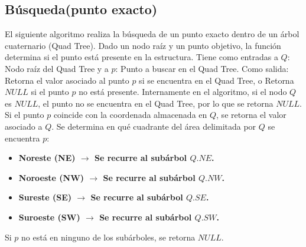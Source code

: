 \documentclass[9pt,a4paper,twoside]{rho-class/rho}
\begin{document}
            
        \subsection{Búsqueda(punto exacto)}
            El siguiente algoritmo realiza la búsqueda de un punto exacto dentro de un árbol cuaternario (Quad Tree). Dado un nodo raíz y un punto objetivo, la función determina si el punto está presente en la estructura. Tiene como entradas a $Q$: Nodo raíz del Quad Tree y a $p$: Punto a buscar en el Quad Tree. Como salida: Retorna el valor asociado al punto $p$ si se encuentra en el Quad Tree, o Retorna $NULL$ si el punto $p$ no está presente.
            Internamente en el algoritmo, si el nodo $Q$ es $NULL$, el punto no se encuentra en el Quad Tree, por lo que se retorna $NULL$. Si el punto $p$ coincide con la coordenada almacenada en $Q$, se retorna el valor asociado a $Q$. Se determina en qué cuadrante del área delimitada por $Q$ se encuentra $p$: \cite{samet_spatial_structures}
            \begin{itemize}
                \item \textbf{Noreste (NE) $\rightarrow$ Se recurre al subárbol $Q.NE$.}
                \item \textbf{Noroeste (NW) $\rightarrow$ Se recurre al subárbol $Q.NW$.}
                \item \textbf{Sureste (SE) $\rightarrow$ Se recurre al subárbol $Q.SE$.}
                \item \textbf{Suroeste (SW) $\rightarrow$ Se recurre al subárbol $Q.SW$.}
            \end{itemize}
            Si $p$ no está en ninguno de los subárboles, se retorna $NULL$.
\end{document}

